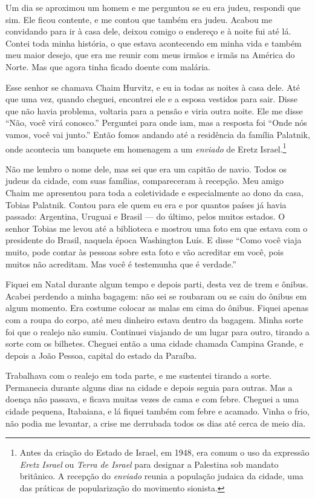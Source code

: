 Um dia se aproximou um homem e me perguntou se eu era judeu, respondi
que sim. Ele ficou contente, e me contou que também era judeu. Acabou me
convidando para ir à casa dele, deixou comigo o endereço e à noite fui até lá.
Contei toda minha história, o que estava acontecendo em minha vida e
também meu maior desejo, que era me reunir com meus irmãos e irmãs na América
do Norte. Mas que agora tinha ficado doente com malária. 

Esse senhor se chamava Chaim Hurvitz, e eu ia todas as noites à casa dele. Até que uma vez, quando cheguei, encontrei ele e a esposa vestidos para sair. Disse que não havia problema, voltaria para a pensão e viria outra noite. Ele me disse ``Não, você virá conosco.'' Perguntei para onde iam, mas a resposta foi ``Onde nós vamos, você vai junto.'' Então fomos andando até a residência da família Palatnik, onde acontecia um banquete em homenagem a um \textit{enviado} de Eretz Israel.\footnote{Antes da criação do Estado de Israel, em 1948, era comum o uso da expressão \textit{Eretz Israel} ou \textit{Terra de Israel} para designar a Palestina sob mandato britânico. A recepção do \textit{enviado} reunia a população judaica da cidade, uma das práticas de popularização do movimento sionista.} 

Não me lembro o nome dele, mas sei que era um capitão de navio. Todos os judeus da cidade, com suas famílias, compareceram à recepção. Meu amigo Chaim me apresentou para toda a coletividade e especialmente ao dono da casa, Tobias Palatnik. Contou para ele quem eu era e por quantos países já havia passado: Argentina, Uruguai e Brasil --- do último, pelos muitos estados. O senhor Tobias me levou até a biblioteca e mostrou uma foto em que estava com o presidente do Brasil, naquela época Washington Luís. E disse ``Como você viaja muito, pode contar às pessoas sobre esta foto e vão acreditar em você, pois muitos não acreditam. Mas você é testemunha que é verdade.''

Fiquei em Natal durante algum tempo e depois parti, desta vez de
trem e ônibus. Acabei perdendo a minha bagagem: não sei se roubaram ou
se caiu do ônibus em algum momento. Era costume colocar as malas
em cima do ônibus. Fiquei apenas com a roupa do corpo, até meu 
dinheiro estava dentro da bagagem. Minha sorte foi
que o realejo não sumiu. Continuei viajando de um lugar para outro,
tirando a sorte com os bilhetes. Cheguei então a uma cidade chamada
Campina Grande, e depois a João Pessoa, capital do estado da Paraíba.

Trabalhava com o realejo em toda parte, e me sustentei tirando a sorte. Permanecia 
durante alguns dias na cidade e depois seguia para outras. Mas a doença não passava, e ficava muitas vezes de cama e com febre. Cheguei a uma cidade pequena, Itabaiana, e lá fiquei também com febre e
acamado. Vinha o frio, não podia me levantar, a crise me derrubada todos os dias até cerca de meio dia. 

